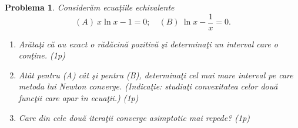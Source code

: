 \documentclass[a4paper]{article}%
\newtheorem{problem}[theorem]{Problema}
\begin{document}
\begin{problem}
\label{Gautschip4.27}Consider\u{a}m ecua\c{t}iile echivalente%
\[
(A)~x\ln x-1=0;\quad(B)~\ln x-\frac{1}{x}=0.
\]


\begin{enumerate}
\item[(a)] Ar\u{a}ta\c{t}i c\u{a} au exact o r\u{a}d\u{a}cin\u{a} pozitiv\u{a}
\c{s}i determina\c{t}i un interval care o con\c{t}ine. (1p)

\item[(b)] At\^{a}t pentru (A) c\^{a}t \c{s}i pentru (B), determina\c{t}i cel
mai mare interval pe care metoda lui Newton converge. (\emph{Indica\c{t}ie}:
studia\c{t}i convexitatea celor dou\u{a} func\c{t}ii care apar \^{\i}n
ecua\c{t}ii.) (1p)

\item[(c)] Care din cele dou\u{a} itera\c{t}ii converge asimptotic mai repede? (1p)
\end{enumerate}
\end{problem}
\end{document}
